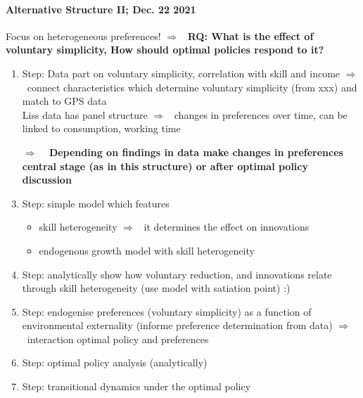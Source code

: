 \documentclass[12pt]{article}
\newcommand{\ar}{$\Rightarrow$ \ }
\begin{document}
\paragraph{Alternative Structure II; Dec. 22 2021}
Focus on heterogeneous preferences! \ar \textbf{RQ: What is the effect of voluntary simplicity, How should optimal policies respond to it?}
\begin{enumerate}
\item Step: Data part on voluntary simplicity, correlation with skill and income
\ar connect characteristics which determine voluntary simplicity (from xxx) and match to GPS data\\ Liss data has panel structure
 \ar changes in preferences over time, can be linked to consumption, working time
 \item[\ar] \textbf{Depending on findings in data make changes in preferences central stage (as in this structure) or after optimal policy discussion}
\item Step: simple model which features
\begin{itemize}
\item skill heterogeneity \ar it determines the effect on innovations
\item endogenous growth model with skill heterogeneity
\end{itemize}
\item Step: analytically show how voluntary reduction, and innovations relate through skill heterogeneity (use model with satiation point) \checkmark :)

\item Step: endogenise preferences (voluntary simplicity) as a function of environmental externality (informe preference determination from data) \ar interaction optimal policy and preferences

\item Step: optimal policy analysis (analytically)
\item Step: transitional dynamics under the optimal policy
\end{enumerate}
\end{document}

